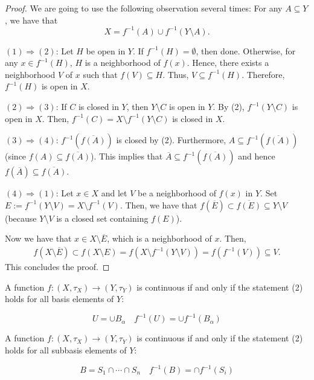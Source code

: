 \begin{proof}

We are going to use the following observation several times:
For any $A\subseteq Y$, we have that 
\[X=f^{-1}(A)\cup f^{-1}(Y\setminus A).\]

  $(1)\Rightarrow(2)$: Let $H$ be open in $Y$. If $f^{-1}(H)=\emptyset$, then done. Otherwise, for any $x\in f^{-1}(H)$, $H$ is a neighborhood of $f(x)$. Hence, there exists a neighborhood $V$ of $x$ such that $f(V)\subseteq H$. Thus, $V\subseteq f^{-1}(H)$. Therefore, $f^{-1}(H)$ is open in $X$.

  $(2)\Rightarrow(3)$: If $C$ is closed in $Y$, then $Y\setminus C$ is open in $Y$. By (2), $f^{-1}(Y\setminus C)$ is open in $X$. Then, $f^{-1}(C)=X\setminus f^{-1}(Y\setminus C)$ is closed in $X$.

  $(3)\Rightarrow(4)$: $f^{-1}(\overline{f(A)})$ is closed by (2). Furthermore, $A\subseteq f^{-1}(\overline{f(A)})$ (since $f(A)\subseteq \overline{f(A)}$). This implies that $\overline{A} \subseteq f^{-1}(\overline{f(A)})$ and hence $f(\overline{A}) \subseteq \overline{f(A)}$.

  $(4)\Rightarrow(1)$: Let $x\in X$ and let $V$ be a neighborhood of $f(x)$ in $Y$. Set $E:=f^{-1}(Y\setminus V)=X\setminus f^{-1}(V)$. Then, we have that $f(\overline{E})\subset \overline{f(E)}\subseteq Y\setminus V$ (because $Y\setminus V$ is a closed set containing $f(E)$).

  Now we have that $x\in X\setminus \overline{E}$, which is a neighborhood of $x$. Then,
  \begin{align*}
    f(X\setminus \overline{E})\subset f(X\setminus E)=f(X\setminus f^{-1}(Y\setminus V))=f(f^{-1}(V))\subseteq V.
  \end{align*}
  This concludes the proof.
\end{proof}



\begin{remark}
  A function $f:(X,{\tau}_X)\to(Y,{\tau}_Y)$ is continuous if and only if the statement (2) holds  for all basis elements of $Y$:

  \[U=\cup B_\alpha\quad f^{-1}(U)=\cup f^{-1}(B_\alpha)\]
  \end{remark}
  
  
  \begin{remark}
  A function $f:(X,{\tau}_X)\to(Y,{\tau}_Y)$ is continuous if and only if the statement (2) holds  for all subbasis elements of $Y$:

  \[B=S_1\cap\cdots\cap S_n\quad f^{-1}(B)=\cap f^{-1}(S_i)\]
\end{remark}

